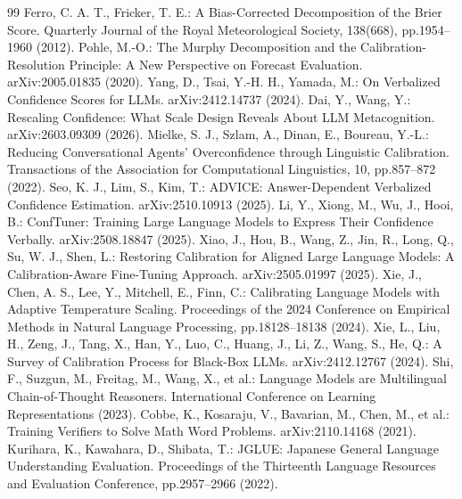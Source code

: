 \begin{thebibliography}{99}
 Ferro, C. A. T., Fricker, T. E.: A Bias-Corrected Decomposition of the Brier Score. Quarterly Journal of the Royal Meteorological Society, 138(668), pp.1954--1960 (2012).
 Pohle, M.-O.: The Murphy Decomposition and the Calibration-Resolution Principle: A New Perspective on Forecast Evaluation. arXiv:2005.01835 (2020).
 Yang, D., Tsai, Y.-H. H., Yamada, M.: On Verbalized Confidence Scores for LLMs. arXiv:2412.14737 (2024).
 Dai, Y., Wang, Y.: Rescaling Confidence: What Scale Design Reveals About LLM Metacognition. arXiv:2603.09309 (2026).
 Mielke, S. J., Szlam, A., Dinan, E., Boureau, Y.-L.: Reducing Conversational Agents' Overconfidence through Linguistic Calibration. Transactions of the Association for Computational Linguistics, 10, pp.857--872 (2022).
 Seo, K. J., Lim, S., Kim, T.: ADVICE: Answer-Dependent Verbalized Confidence Estimation. arXiv:2510.10913 (2025).
 Li, Y., Xiong, M., Wu, J., Hooi, B.: ConfTuner: Training Large Language Models to Express Their Confidence Verbally. arXiv:2508.18847 (2025).
 Xiao, J., Hou, B., Wang, Z., Jin, R., Long, Q., Su, W. J., Shen, L.: Restoring Calibration for Aligned Large Language Models: A Calibration-Aware Fine-Tuning Approach. arXiv:2505.01997 (2025).
 Xie, J., Chen, A. S., Lee, Y., Mitchell, E., Finn, C.: Calibrating Language Models with Adaptive Temperature Scaling. Proceedings of the 2024 Conference on Empirical Methods in Natural Language Processing, pp.18128--18138 (2024).
 Xie, L., Liu, H., Zeng, J., Tang, X., Han, Y., Luo, C., Huang, J., Li, Z., Wang, S., He, Q.: A Survey of Calibration Process for Black-Box LLMs. arXiv:2412.12767 (2024).
 Shi, F., Suzgun, M., Freitag, M., Wang, X., et al.: Language Models are Multilingual Chain-of-Thought Reasoners. International Conference on Learning Representations (2023).
 Cobbe, K., Kosaraju, V., Bavarian, M., Chen, M., et al.: Training Verifiers to Solve Math Word Problems. arXiv:2110.14168 (2021).
 Kurihara, K., Kawahara, D., Shibata, T.: JGLUE: Japanese General Language Understanding Evaluation. Proceedings of the Thirteenth Language Resources and Evaluation Conference, pp.2957--2966 (2022).
\end{thebibliography}
